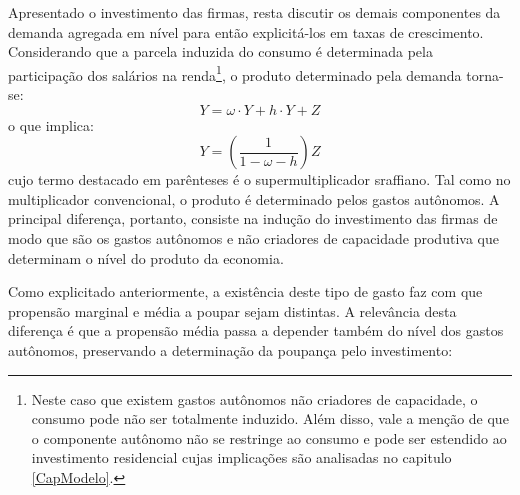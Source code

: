 Apresentado o investimento das firmas, resta discutir os demais componentes da demanda agregada em nível para então explicitá-los em taxas de crescimento.
Considerando que a parcela induzida do consumo é determinada pela participação dos salários  na renda\footnote{Neste caso que existem gastos autônomos não criadores de capacidade, o consumo pode não ser totalmente induzido. Além disso, vale a menção de que o componente autônomo não se restringe ao consumo e pode ser estendido ao investimento residencial cujas implicações são analisadas no capitulo \ref{CapModelo}.}, o produto determinado pela demanda torna-se:
\begin{equation}
\label{PIBSuper}
Y = \omega\cdot Y + h\cdot Y + Z
\end{equation}
o que implica:
\begin{equation}
\label{Supermultiplicador}
Y = \left(\frac{1}{1 - \omega - h}\right)Z
\end{equation}
cujo termo destacado em parênteses é o supermultiplicador sraffiano. Tal como no multiplicador convencional, o produto é determinado pelos gastos autônomos.
A principal diferença, portanto, consiste
na indução do investimento das firmas de modo que são os gastos autônomos e não criadores de capacidade produtiva que determinam o nível do produto da economia.


Como explicitado anteriormente, a existência deste tipo de gasto faz com que propensão marginal e média a poupar sejam distintas. A relevância desta diferença é que a propensão média passa a depender também do nível dos gastos autônomos, preservando a determinação da poupança pelo investimento:


